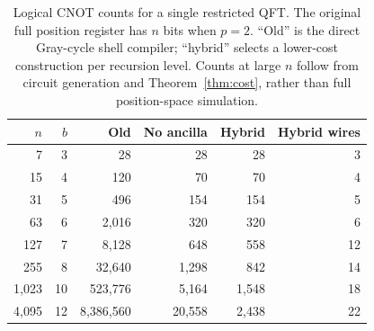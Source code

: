 \documentclass[11pt]{article}
\begin{document}
\begin{table}[htbp]
\centering\small
\caption{Logical CNOT counts for a single restricted QFT. The original full position register has $n$ bits when $p=2$. ``Old'' is the direct Gray-cycle shell compiler; ``hybrid'' selects a lower-cost construction per recursion level. Counts at large $n$ follow from circuit generation and Theorem~\ref{thm:cost}, rather than full position-space simulation.}
\begin{tabular}{rrrrrr}
\toprule
$n$ & $b$ & Old & No ancilla & Hybrid & Hybrid wires\\
\midrule
7 & 3 & 28 & 28 & 28 & 3\\
15 & 4 & 120 & 70 & 70 & 4\\
31 & 5 & 496 & 154 & 154 & 5\\
63 & 6 & 2,016 & 320 & 320 & 6\\
127 & 7 & 8,128 & 648 & 558 & 12\\
255 & 8 & 32,640 & 1,298 & 842 & 14\\
1,023 & 10 & 523,776 & 5,164 & 1,548 & 18\\
4,095 & 12 & 8,386,560 & 20,558 & 2,438 & 22\\
\bottomrule
\end{tabular}
\end{table}
\end{document}
